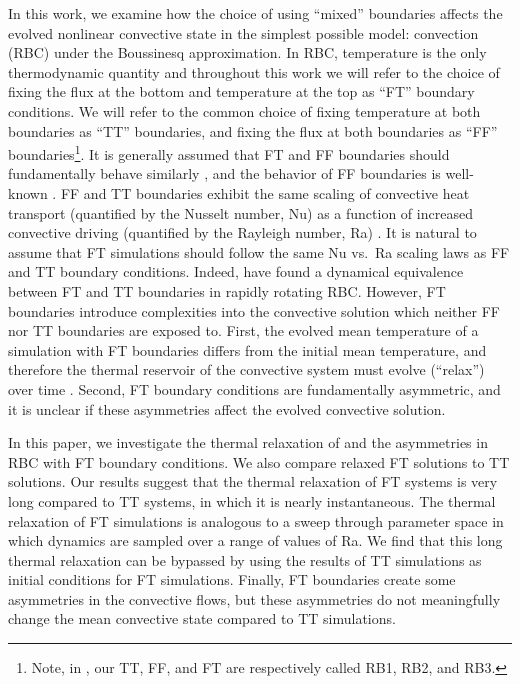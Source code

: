 In this work, we examine how the choice of using ``mixed'' boundaries affects the evolved nonlinear convective state in the simplest possible model: \RB convection (RBC) under the Boussinesq approximation.
In RBC, temperature is the only thermodynamic quantity and throughout this work we will refer to the choice of fixing the flux at the bottom and temperature at the top as ``FT'' boundary conditions.
We will refer to the common choice of fixing temperature at both boundaries as ``TT'' boundaries, and fixing the flux at both boundaries as ``FF'' boundaries\footnote{Note, in \citet{goluskin2016}, our TT, FF, and FT are respectively called RB1, RB2, and RB3.}.
It is generally assumed that FT and FF boundaries should fundamentally behave similarly \citep{goluskin2016}, and the behavior of FF boundaries is well-known \citep{otero&all2002, johnston&doering2009}.
FF and TT boundaries exhibit the same scaling of convective heat transport (quantified by the Nusselt number, Nu) as a function of increased convective driving (quantified by the Rayleigh number, Ra) \citep{johnston&doering2009}.
It is natural to assume that FT simulations should follow the same Nu vs.~Ra scaling laws as FF and TT boundary conditions.
Indeed, \citet{calkins&all2015b} have found a dynamical equivalence between FT and TT boundaries in rapidly rotating RBC.
However, FT boundaries introduce complexities into the convective solution which neither FF nor TT boundaries are exposed to.
First, the evolved mean temperature of a simulation with FT boundaries differs from the initial mean temperature, and therefore the thermal reservoir of the convective system must evolve (``relax'') over time \citep{anders&all2018}.
Second, FT boundary conditions are fundamentally asymmetric, and it is unclear if these asymmetries affect the evolved convective solution.

In this paper, we investigate the thermal relaxation of and the asymmetries in RBC with FT boundary conditions.
We also compare relaxed FT solutions to TT solutions.
Our results suggest that the thermal relaxation of FT systems is very long compared to TT systems, in which it is nearly instantaneous.
The thermal relaxation of FT simulations is analogous to a sweep through parameter space in which dynamics are sampled over a range of values of Ra.
We find that this long thermal relaxation can be bypassed by using the results of TT simulations as initial conditions for FT simulations.
Finally, FT boundaries create some asymmetries in the convective flows, but these asymmetries do not meaningfully change the mean convective state compared to TT simulations.

